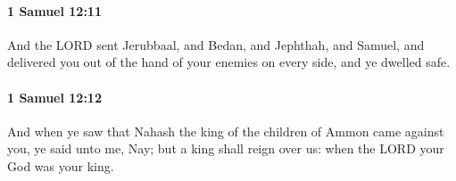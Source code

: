 		\paragraph{1 Samuel 12:11} %
			\label{1SAMUEL-12-11}

			And the LORD sent Jerubbaal, and Bedan, and Jephthah, and Samuel, and delivered you out of the hand of your enemies on every side, and ye dwelled safe.


		\paragraph{1 Samuel 12:12} %
			\label{1SAMUEL-12-12}

			And when ye saw that Nahash the king of the children of Ammon came against you, ye said unto me, Nay; but a king shall reign over us: when the LORD your God was your king.


